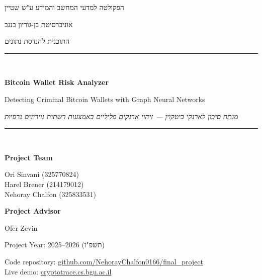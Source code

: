 \documentclass[12pt,a4paper,openany]{report}
\newcommand{\heb}[1]{{\hebrewfont\beginR #1\endR}}
\newcommand{\repo}{\href{https://github.com/NehorayChalfon0166/final_project}{github.com/NehorayChalfon0166/final\_project}}
\newcommand{\live}{\href{https://cryptotrace.cs.bgu.ac.il/}{cryptotrace.cs.bgu.ac.il}}
\begin{document}
\sloppy

\begin{titlepage}
\centering
\vspace*{0.6cm}
{\large\heb{הפקולטה למדעי המחשב והמידע ע"ש שטיין}\par}
\vspace{3pt}
{\large\heb{אוניברסיטת בן-גוריון בנגב}\par}
\vspace{3pt}
{\large\heb{התוכנית להנדסת נתונים}\par}
\vspace{1.6cm}

\rule{\linewidth}{0.4pt}\\[0.5cm]
{\Huge\bfseries Bitcoin Wallet Risk Analyzer\par}
\vspace{0.35cm}
{\large Detecting Criminal Bitcoin Wallets with Graph Neural Networks\par}
\vspace{0.35cm}
{\large\itshape \heb{מנתח סיכון לארנקי ביטקוין — זיהוי ארנקים פליליים באמצעות רשתות נוירונים גרפיות}\par}
\rule{\linewidth}{0.4pt}\\[1.4cm]

{\large\bfseries Project Team\par}
\vspace{0.3cm}
{\large
Ori Sinvani \quad(325770824)\\[3pt]
Harel Brener \quad(214179012)\\[3pt]
Nehoray Chalfon \quad(325833531)\par}
\vspace{1.1cm}

{\large\bfseries Project Advisor\par}
\vspace{0.2cm}
{\large Ofer Zevin\par}
\vfill

{\large Project Year: 2025--2026 \; (\heb{תשפ"ו})\par}
\vspace{0.5cm}
{\small Code repository: \repo\\ Live demo: \live}
\end{titlepage}

\setcounter{page}{2}
\end{document}
